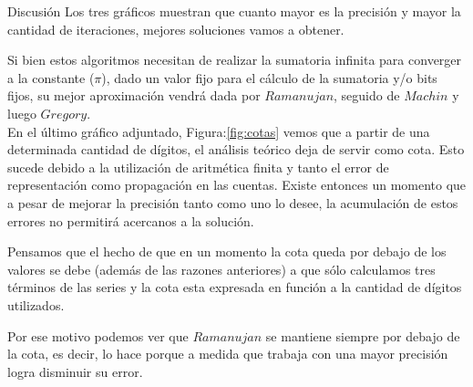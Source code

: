 \begin{section}{Discusión}
	Los tres gráficos muestran que cuanto mayor es la precisión y mayor la cantidad de iteraciones, mejores soluciones vamos a obtener.
	
	Si bien estos algoritmos necesitan de realizar la sumatoria infinita para converger a la constante ($\pi$), dado un valor fijo para el cálculo de la sumatoria y/o bits fijos, su mejor aproximación vendrá dada por $Ramanujan$, seguido de $Machin$ y luego $Gregory$.
	\\
	
	En el último gráfico adjuntado, Figura:\ref{fig:cotas} vemos que a partir de una determinada cantidad de dígitos, el análisis teórico deja de servir como cota. Esto sucede debido a la utilización de aritmética finita y tanto el error de representación como propagación en las cuentas. Existe entonces un momento que a pesar de mejorar la precisión tanto como uno lo desee, la acumulación de estos errores no permitirá acercanos a la solución.
	
	Pensamos que el hecho de que en un momento la cota queda por debajo de los valores se debe (además de las razones anteriores) a que sólo calculamos tres términos de las series y la cota esta expresada en función a la cantidad de dígitos utilizados.
	
	Por ese motivo podemos ver que $Ramanujan$ se mantiene siempre por debajo de la cota, es decir, lo hace porque a medida que trabaja con una mayor precisión logra disminuir su error.
\end{section}
